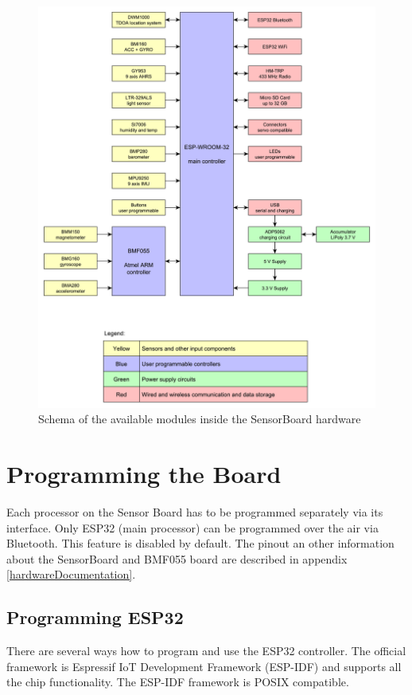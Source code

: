 \begin{figure}
	\centering
	\label{fig:SWmodules}
	\caption{Schema of the available modules inside the SensorBoard hardware}
	\includegraphics[width=16cm]{img/SensorBoardSchema.pdf}
\end{figure}

\section{Programming the Board}
Each processor on the Sensor Board has to be programmed separately via its interface. Only ESP32 \cite{espressif:ESP-WROOM-32} (main processor) can be programmed over the air via Bluetooth. This feature is disabled by default. The pinout an other information about the SensorBoard and BMF055 board are described in appendix \ref{hardwareDocumentation}.

\subsection{Programming ESP32}
There are several ways how to program and use the ESP32 \cite{espressif:ESP-WROOM-32} controller. The official framework is Espressif IoT Development Framework (ESP-IDF) \cite{espressif:ESP-IDF} and supports all the chip functionality. The ESP-IDF framework is POSIX compatible.

